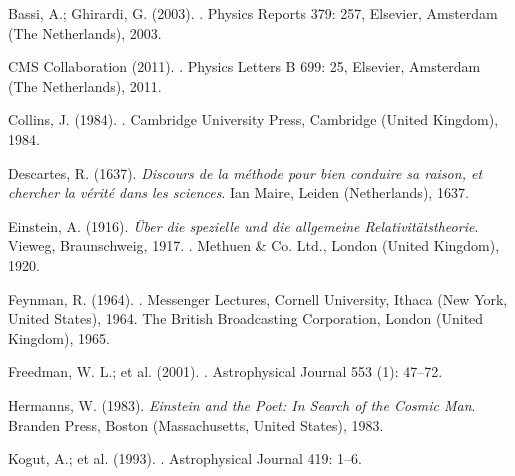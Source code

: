 \documentclass[10pt,a4paper,twoside,openany]{book}
\begin{document}
\backmatter

\begin{thebibliography}{99}

 Bassi, A.; Ghirardi, G. (2003). . Physics Reports 379: 257, Elsevier, Amsterdam (The Netherlands), 2003.

 CMS Collaboration (2011). . Physics Letters B 699: 25, Elsevier, Amsterdam (The Netherlands), 2011.

 Collins, J. (1984). . Cambridge University Press, Cambridge (United Kingdom), 1984.

 Descartes, R. (1637). \textit{Discours de la méthode pour bien conduire sa raison, et chercher la vérité dans les sciences}. Ian Maire, Leiden (Netherlands), 1637.

 Einstein, A. (1916). \textit{Über die spezielle und die allgemeine Relativitätstheorie}. Vieweg, Braunschweig, 1917. . Methuen \& Co. Ltd., London (United Kingdom), 1920.

 Feynman, R. (1964). . Messenger Lectures, Cornell University, Ithaca (New York, United States), 1964. The British Broadcasting Corporation, London (United Kingdom), 1965.

 Freedman, W. L.; et al. (2001). . Astrophysical Journal 553 (1): 47–72.

 Hermanns, W. (1983). \textit{Einstein and the Poet: In Search of the Cosmic Man}. Branden Press, Boston (Massachusetts, United States), 1983.

 Kogut, A.; et al. (1993). . Astrophysical Journal 419: 1–6.


\end{thebibliography}
\end{document}
